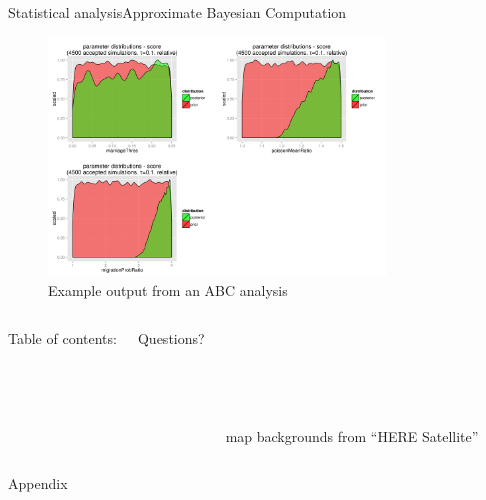\documentclass[10pt,aspectratio=43]{beamer}
\begin{document}
\begin{frame}{Statistical analysis}{Approximate Bayesian Computation}
\begin{center}
  \begin{figure}
    \includegraphics[width=0.8\textwidth]{../data/abc-priors-posteriors.png}
    \caption{Example output from an ABC analysis}
  \end{figure}
\end{center}
\end{frame}


\begin{frame}[plain]
\begin{columns}
    Table of contents:\\~\\
    \tableofcontents[subsubsectionstyle=hide]

    \begin{Huge}
      Questions?
    \end{Huge}
    \\~\\~\\~\\~\\
    \color{lightgray}
    map backgrounds from “HERE Satellite”

\end{columns}
\end{frame}


\begin{frame}[noframenumbering]
Appendix
\end{frame}
\end{document}
